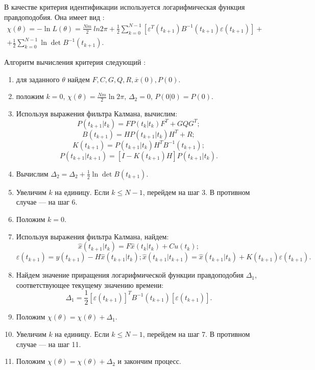 \documentclass[a4paper,14pt]{extarticle}
\renewcommand{\vec}[1]{#1}
\newcommand{\eps}{\varepsilon}
\begin{document}
В качестве критерия идентификации используется логарифмическая функция
правдоподобия. Она имеет вид \cite{mono}:
\begin{equation*}
\begin{split}
  \chi(\theta) = -\ln{L(\theta)} = \frac{Nm}{2}\ ln{2\pi} + \frac{1}{2}
  \sum\limits_{k=0}^{N-1} \left[ \eps^T(t_{k+1}) B^{-1}(t_{k+1}) \eps(t_{k+1}) \right]
  + \\ + \frac{1}{2} \sum\limits_{k=0}^{N-1} \ln \det B^{-1}(t_{k+1}).
\end{split}
\end{equation*}

Алгоритм вычисления критерия следующий \cite{mono}:

\begin{enumerate}
\item для заданного $\theta$  найдем $F, C, G, Q, R, \overline{\vec{x}}(0),
P(0)$.
\item положим $k = 0$, $\chi(\theta) = \frac{Nm}{2} \ln{2\pi}$, $\Delta_2 = 0$,
$P(0|0) = P(0)$.
\item Используя выражения фильтра Калмана, вычислим:
\[
  P(t_{k+1}|t_k) = F P(t_k|t_k) F^T + GQG^T;
\]
\[
  B(t_{k+1}) = H P(t_{k+1}|t_k) H^T + R;
\]
\[
  K(t_{k+1}) = P(t_{k+1}|t_k) H^T B^{-1}(t_{k+1});
\]
\[
  P(t_{k+1}|t_{k+1}) = \left[ I - K(t_{k+1}) H \right] P(t_{k+1}|t_k).
\]
\item Вычислим $\Delta_2 = \Delta_2 + \frac{1}{2} \ln \det B(t_{k+1})$.
\item Увеличим $k$ на единицу. Если $k \le N-1$, перейдем на шаг 3. В противном
случае --- на шаг 6.
\item Положим $k = 0$.
\item Используя выражения фильтра Калмана, найдем:
\[
  \hat{x}(t_{k+1}|t_k) = F \hat{x}(t_k|t_k) + C u(t_k);
\]
\[
  \eps(t_{k+1}) = y(t_{k+1}) - H \hat{x} (t_{k+1}|t_k);
  \hat{x}(t_{k+1}|t_{k+1}) = \hat{x}(t_{k+1}|t_k) + K(t_{k+1}) \eps(t_{k+1}).
\]
\item Найдем значение приращения логарифмической функции правдоподобия
$\Delta_1$, соответствующее текущему значению времени:
\[
  \Delta_1 = \frac{1}{2} \left[ \eps(t_{k+1}) \right]^T B^{-1}(t_{k+1}) 
  \left[ \eps(t_{k+1}) \right].
\]
\item Положим $\chi(\theta) = \chi(\theta) + \Delta_1$.
\item Увеличим $k$ на единицу. Если $k \le N-1$, перейдем на шаг 7.
В противном случае --- на шаг 11.
\item Положим $\chi(\theta) = \chi(\theta) + \Delta_2$ и закончим процесс.
\end{enumerate}
\end{document}
